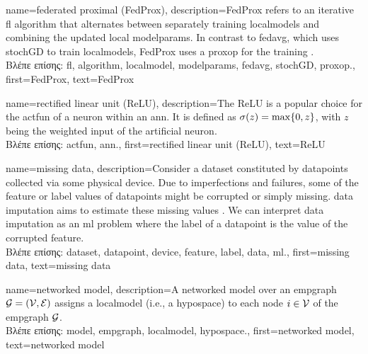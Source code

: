 {name={federated proximal (FedProx)},
	description={FedProx refers to an iterative \gls{fl} \gls{algorithm} that alternates between separately 
		training \gls{localmodel}s and combining the updated 
		local \gls{modelparams}. In contrast to \gls{fedavg}, which uses 
		\gls{stochGD} to train \gls{localmodel}s, FedProx uses a \gls{proxop} for the training \cite{FedProx2020}.\\
		\foreignlanguage{greek}{Βλέπε επίσης:} \gls{fl}, \gls{algorithm}, \gls{localmodel}, \gls{modelparams}, 
		\gls{fedavg}, \gls{stochGD}, \gls{proxop}.}, 
	first={FedProx}, 
	text={FedProx} 
}

{name={rectified linear unit (ReLU)},
	description={The ReLU is 
		a popular choice for the \gls{actfun} of a neuron within an \gls{ann}. It is defined 
		as $\sigma(z) = \max\{0,z\}$, with $z$ being the weighted input of the artificial 
		neuron.\\
		\foreignlanguage{greek}{Βλέπε επίσης:} \gls{actfun}, \gls{ann}.}, 
	first={rectified linear unit (ReLU)}, 
	text={ReLU} 
}

{name={missing data},
	description={Consider a \gls{dataset} constituted by \gls{datapoint}s collected via 
		some physical \gls{device}. Due to imperfections and failures, some of the \gls{feature} 
		or \gls{label} values of \gls{datapoint}s might be corrupted or simply missing. 
		\Gls{data} imputation aims to estimate these missing values \cite{Abayomi2008DiagnosticsFM}. 
		We can interpret \gls{data} imputation as an \gls{ml} problem where the \gls{label} of a \gls{datapoint} is 
		the value of the corrupted \gls{feature}.\\
		\foreignlanguage{greek}{Βλέπε επίσης:} \gls{dataset}, \gls{datapoint}, \gls{device}, \gls{feature}, \gls{label}, \gls{data}, \gls{ml}.},
	first={missing data},
	text={missing data}  
}

{name={networked model},
	description={A networked \gls{model} over an \gls{empgraph} $\mathcal{G} = \left( \mathcal{V},\mathcal{E} \right)$ assigns 
   		a \gls{localmodel} (i.e., a \gls{hypospace}) to each node $i \in \mathcal{V}$ of the \gls{empgraph} $\mathcal{G}$.\\
  	 	\foreignlanguage{greek}{Βλέπε επίσης:} \gls{model}, \gls{empgraph}, \gls{localmodel}, \gls{hypospace}.}, 
   	first={networked model},
   	text={networked model}  
}


